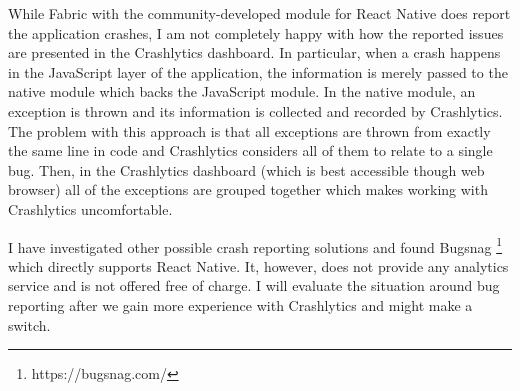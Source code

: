 While Fabric with the community-developed module for React Native does report the application crashes, I am not completely happy with how the reported issues are presented in the Crashlytics dashboard. In particular, when a crash happens in the JavaScript layer of the application, the information is merely passed to the native module which backs the JavaScript module. In the native module, an exception is thrown and its information is collected and recorded by Crashlytics. The problem with this approach is that all exceptions are thrown from exactly the same line in code and Crashlytics considers all of them to relate to a single bug. Then, in the Crashlytics dashboard (which is best accessible though web browser) all of the exceptions are grouped together which makes working with Crashlytics uncomfortable. 

I have investigated other possible crash reporting solutions and found Bugsnag \footnote{https://bugsnag.com/} which directly supports React Native. It, however, does not provide any analytics service and is not offered free of charge. I will evaluate the situation around bug reporting after we gain more experience with Crashlytics and might make a switch.
